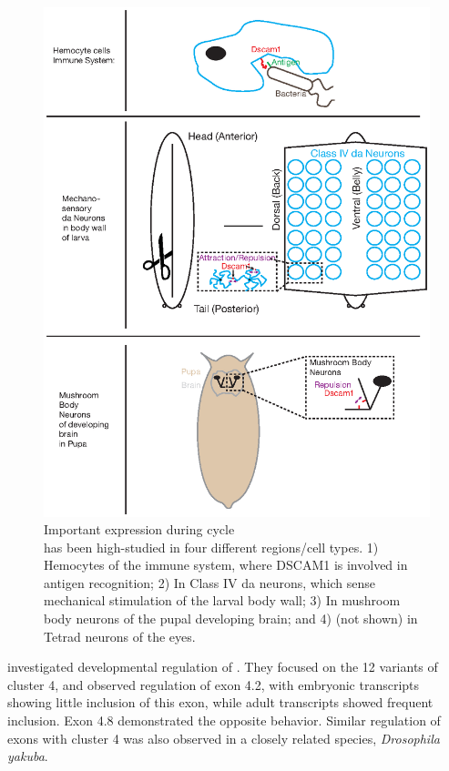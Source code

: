     \begin{figure}[htbp] %
      \centering 
      \includegraphics{Figures/Intro/DscamAnatomy.eps}
      \caption[Important \dscam{} expression during \flies{} life cycle]
      {
        Important \dscam{} expression during \flies{} cycle\\[0.25cm]
        \dscam{} has been high-studied in four different regions/cell types. 1) Hemocytes of the immune system, where DSCAM1 is involved in antigen recognition; 2) In Class IV da neurons, which sense mechanical stimulation of the larval body wall; 3) In mushroom body neurons of the pupal developing brain; and 4) (not shown) in Tetrad neurons of the eyes.
        }
      \label{fig:DscamAnatomy}
      \end{figure}

    \citet{Celotto2001} investigated developmental regulation of \dscam{}. They focused on the 12 variants of cluster 4, and observed regulation of exon 4.2, with embryonic transcripts showing little inclusion of this exon, while adult transcripts showed frequent inclusion. Exon 4.8 demonstrated the opposite behavior. Similar regulation of exons with cluster 4 was also observed in a closely related species, \textit{Drosophila yakuba}. 


